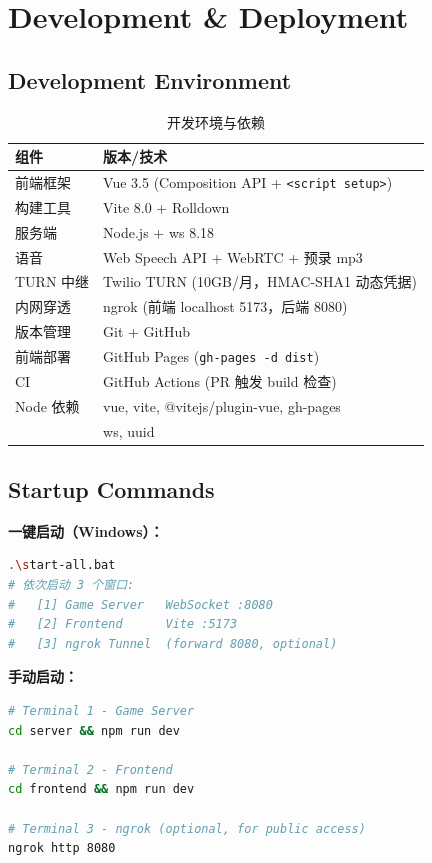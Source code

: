 \documentclass[11pt,a4paper]{article}
\begin{document}
\section{Development \& Deployment}

\subsection{Development Environment}

\begin{table}[H]
\centering
\caption{开发环境与依赖}
\label{tab:env}
\small
\begin{tabular}{@{}ll@{}}
\toprule
\textbf{组件} & \textbf{版本/技术} \\
\midrule
前端框架 & Vue 3.5 (Composition API + \texttt{<script setup>}) \\
构建工具 & Vite 8.0 + Rolldown \\
服务端 & Node.js + ws 8.18 \\
语音 & Web Speech API + WebRTC + 预录 mp3 \\
TURN 中继 & Twilio TURN (10GB/月，HMAC-SHA1 动态凭据) \\
内网穿透 & ngrok (前端 localhost 5173，后端 8080) \\
版本管理 & Git + GitHub \\
前端部署 & GitHub Pages (\texttt{gh-pages -d dist}) \\
CI & GitHub Actions (PR 触发 build 检查) \\
\midrule
Node 依赖 & vue, vite, @vitejs/plugin-vue, gh-pages \\
 & ws, uuid \\
\bottomrule
\end{tabular}
\end{table}

\subsection{Startup Commands}

\textbf{一键启动（Windows）：}
\begin{lstlisting}[language=bash, basicstyle=\ttfamily\small]
.\start-all.bat
# 依次启动 3 个窗口:
#   [1] Game Server   WebSocket :8080
#   [2] Frontend      Vite :5173
#   [3] ngrok Tunnel  (forward 8080, optional)
\end{lstlisting}

\textbf{手动启动：}
\begin{lstlisting}[language=bash, basicstyle=\ttfamily\small]
# Terminal 1 - Game Server
cd server && npm run dev

# Terminal 2 - Frontend
cd frontend && npm run dev

# Terminal 3 - ngrok (optional, for public access)
ngrok http 8080
\end{lstlisting}
\end{document}
